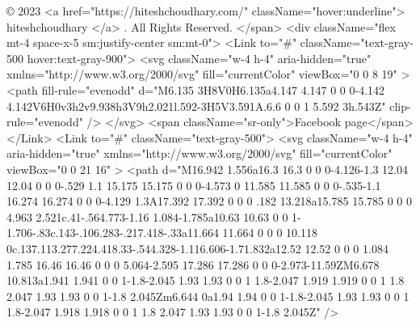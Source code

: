 {                                            © 2023
                                            <a href="https://hiteshchoudhary.com/" className="hover:underline">
                                                hiteshchoudhary
                                            </a>
                                            . All Rights Reserved.
                                        </span>
                                        <div className="flex mt-4 space-x-5 sm:justify-center sm:mt-0">
                                            <Link to="#" className="text-gray-500 hover:text-gray-900">
                                                <svg
                                                    className="w-4 h-4"
                                                    aria-hidden="true"
                                                    xmlns="http://www.w3.org/2000/svg"
                                                    fill="currentColor"
                                                    viewBox="0 0 8 19"
                                                >
                                                    <path
                                                        fill-rule="evenodd"
                                                        d="M6.135 3H8V0H6.135a4.147 4.147 0 0 0-4.142 4.142V6H0v3h2v9.938h3V9h2.021l.592-3H5V3.591A.6.6 0 0 1 5.592 3h.543Z"
                                                        clip-rule="evenodd"
                                                    />
                                                </svg>
                                                <span className="sr-only">Facebook page</span>
                                            </Link>
                                            <Link to="#" className="text-gray-500">
                                                <svg
                                                    className="w-4 h-4"
                                                    aria-hidden="true"
                                                    xmlns="http://www.w3.org/2000/svg"
                                                    fill="currentColor"
                                                    viewBox="0 0 21 16"
                                                >
                                                    <path d="M16.942 1.556a16.3 16.3 0 0 0-4.126-1.3 12.04 12.04 0 0 0-.529 1.1 15.175 15.175 0 0 0-4.573 0 11.585 11.585 0 0 0-.535-1.1 16.274 16.274 0 0 0-4.129 1.3A17.392 17.392 0 0 0 .182 13.218a15.785 15.785 0 0 0 4.963 2.521c.41-.564.773-1.16 1.084-1.785a10.63 10.63 0 0 1-1.706-.83c.143-.106.283-.217.418-.33a11.664 11.664 0 0 0 10.118 0c.137.113.277.224.418.33-.544.328-1.116.606-1.71.832a12.52 12.52 0 0 0 1.084 1.785 16.46 16.46 0 0 0 5.064-2.595 17.286 17.286 0 0 0-2.973-11.59ZM6.678 10.813a1.941 1.941 0 0 1-1.8-2.045 1.93 1.93 0 0 1 1.8-2.047 1.919 1.919 0 0 1 1.8 2.047 1.93 1.93 0 0 1-1.8 2.045Zm6.644 0a1.94 1.94 0 0 1-1.8-2.045 1.93 1.93 0 0 1 1.8-2.047 1.918 1.918 0 0 1 1.8 2.047 1.93 1.93 0 0 1-1.8 2.045Z" />
}
